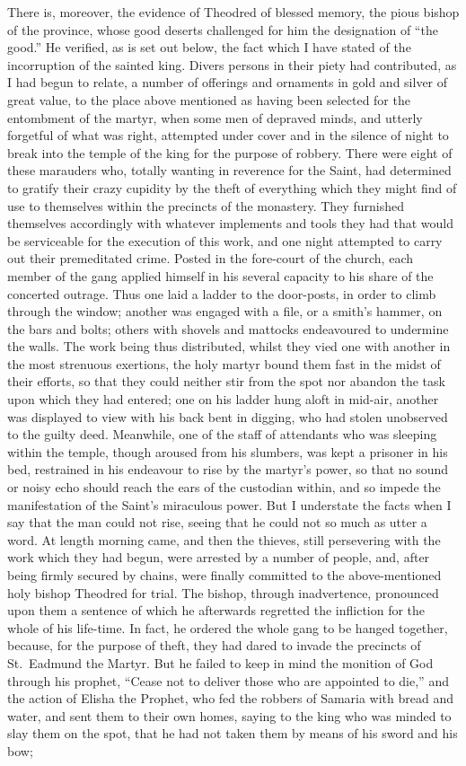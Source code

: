 \documentclass[10pt]{book}
\begin{document}
\begin{paracol}{2}
There is, moreover, the evidence of Theodred of blessed memory, the pious bishop of the province, whose good deserts challenged for him the designation of ``the good.'' He verified, as is set out below, the fact which I have stated of the incorruption of the sainted king. Divers persons in their piety had contributed, as I had begun to relate, a number of offerings and ornaments in gold and silver of great value, to the place above mentioned as having been selected for the entombment of the martyr, when some men of depraved minds, and utterly forgetful of what was right, attempted under cover and in the silence of night to break into the temple of the king for the purpose of robbery. There were eight of these marauders who, totally wanting in reverence for the Saint, had determined to gratify their crazy cupidity by the theft of everything which they might find of use to themselves within the precincts of the monastery. They furnished themselves accordingly with whatever implements and tools they had that would be serviceable for the execution of this work, and one night attempted to carry out their premeditated crime. Posted in the fore-court of the church, each member of the gang applied himself in his several capacity to his share of the concerted outrage. Thus one laid a ladder to the door-posts, in order to climb through the window; another was engaged with a file, or a smith's hammer, on the bars and bolts; others with shovels and mattocks endeavoured to undermine the walls. The work being thus distributed, whilst they vied one with another in the most strenuous exertions, the holy martyr bound them fast in the midst of their efforts, so that they could neither stir from the spot nor abandon the task upon which they had entered; one on his ladder hung aloft in mid-air, another was displayed to view with his back bent in digging, who had stolen unobserved to the guilty deed. Meanwhile, one of the staff of attendants who was sleeping within the temple, though aroused from his slumbers, was kept a prisoner in his bed, restrained in his endeavour to rise by the martyr's power, so that no sound or noisy echo should reach the ears of the custodian within, and so impede the manifestation of the Saint's miraculous power. But I understate the facts when I say that the man could not rise, seeing that he could not so much as utter a word. At length morning came, and then the thieves, still persevering with the work which they had begun, were arrested by a number of people, and, after being firmly secured by chains, were finally committed to the above-mentioned holy bishop Theodred for trial. The bishop, through inadvertence, pronounced upon them a sentence of which he afterwards regretted the infliction for the whole of his life-time. In fact, he ordered the whole gang to be hanged together, because, for the purpose of theft, they had dared to invade the precincts of St.\ Eadmund the Martyr. But he failed to keep in mind the monition of God through his prophet, ``Cease not to deliver those who are appointed to die,'' and the action of Elisha the Prophet, who fed the robbers of Samaria with bread and water, and sent them to their own homes, saying to the king who was minded to slay them on the spot, that he had not taken them by means of his sword and his bow; 
\end{paracol}
\end{document}
